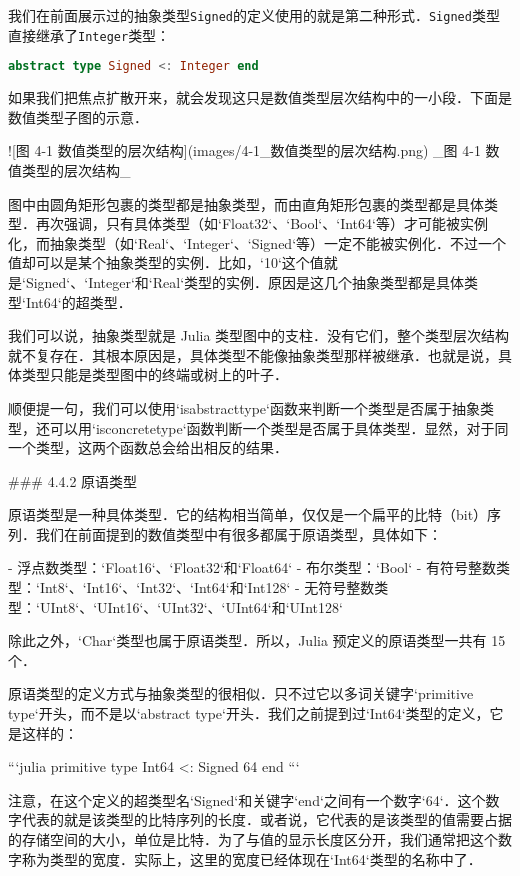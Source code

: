 我们在前面展示过的抽象类型\verb|Signed|的定义使用的就是第二种形式．\verb|Signed|类型直接继承了\verb|Integer|类型：

\begin{lstlisting}[language=julia]
abstract type Signed <: Integer end
\end{lstlisting}

如果我们把焦点扩散开来，就会发现这只是数值类型层次结构中的一小段．下面是数值类型子图的示意．

![图 4-1 数值类型的层次结构](images/4-1_数值类型的层次结构.png)
_图 4-1 数值类型的层次结构_

图中由圆角矩形包裹的类型都是抽象类型，而由直角矩形包裹的类型都是具体类型．再次强调，只有具体类型（如`Float32`、`Bool`、`Int64`等）才可能被实例化，而抽象类型（如`Real`、`Integer`、`Signed`等）一定不能被实例化．不过一个值却可以是某个抽象类型的实例．比如，`10`这个值就是`Signed`、`Integer`和`Real`类型的实例．原因是这几个抽象类型都是具体类型`Int64`的超类型．

我们可以说，抽象类型就是 Julia 类型图中的支柱．没有它们，整个类型层次结构就不复存在．其根本原因是，具体类型不能像抽象类型那样被继承．也就是说，具体类型只能是类型图中的终端或树上的叶子．

顺便提一句，我们可以使用`isabstracttype`函数来判断一个类型是否属于抽象类型，还可以用`isconcretetype`函数判断一个类型是否属于具体类型．显然，对于同一个类型，这两个函数总会给出相反的结果．

### 4.4.2 原语类型

原语类型是一种具体类型．它的结构相当简单，仅仅是一个扁平的比特（bit）序列．我们在前面提到的数值类型中有很多都属于原语类型，具体如下：

- 浮点数类型：`Float16`、`Float32`和`Float64`
- 布尔类型：`Bool`
- 有符号整数类型：`Int8`、`Int16`、`Int32`、`Int64`和`Int128`
- 无符号整数类型：`UInt8`、`UInt16`、`UInt32`、`UInt64`和`UInt128`

除此之外，`Char`类型也属于原语类型．所以，Julia 预定义的原语类型一共有 15 个．

原语类型的定义方式与抽象类型的很相似．只不过它以多词关键字`primitive type`开头，而不是以`abstract type`开头．我们之前提到过`Int64`类型的定义，它是这样的：

```julia 
primitive type Int64 <: Signed 64 end
```

注意，在这个定义的超类型名`Signed`和关键字`end`之间有一个数字`64`．这个数字代表的就是该类型的比特序列的长度．或者说，它代表的是该类型的值需要占据的存储空间的大小，单位是比特．为了与值的显示长度区分开，我们通常把这个数字称为类型的宽度．实际上，这里的宽度已经体现在`Int64`类型的名称中了．

